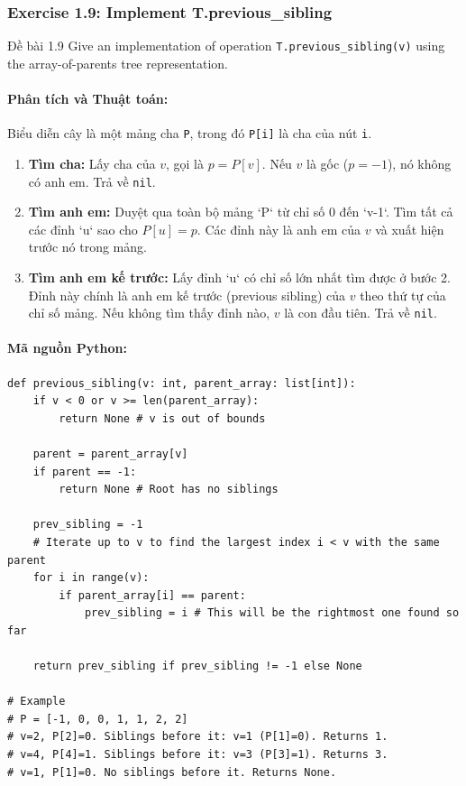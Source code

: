 \documentclass[a4paper,12pt]{article}
\begin{document}
\subsubsection{Exercise 1.9: Implement T.previous\_sibling}
\begin{problembox}{Đề bài 1.9}
    Give an implementation of operation \texttt{T.previous\_sibling(v)} using the array-of-parents tree representation.
\end{problembox}

\paragraph{Phân tích và Thuật toán:}
Biểu diễn cây là một mảng cha \texttt{P}, trong đó \texttt{P[i]} là cha của nút \texttt{i}.
\begin{enumerate}
    \item \textbf{Tìm cha:} Lấy cha của $v$, gọi là $p = P[v]$. Nếu $v$ là gốc ($p=-1$), nó không có anh em. Trả về \texttt{nil}.
    \item \textbf{Tìm anh em:} Duyệt qua toàn bộ mảng `P` từ chỉ số 0 đến `v-1`. Tìm tất cả các đỉnh `u` sao cho $P[u] = p$. Các đỉnh này là anh em của $v$ và xuất hiện trước nó trong mảng.
    \item \textbf{Tìm anh em kế trước:} Lấy đỉnh `u` có chỉ số lớn nhất tìm được ở bước 2. Đỉnh này chính là anh em kế trước (previous sibling) của $v$ theo thứ tự của chỉ số mảng. Nếu không tìm thấy đỉnh nào, $v$ là con đầu tiên. Trả về \texttt{nil}.
\end{enumerate}

\paragraph{Mã nguồn Python:}
\begin{lstlisting}[style=pythonstyle, caption={Tìm anh em kế trước trong biểu diễn Mảng Cha.}]
def previous_sibling(v: int, parent_array: list[int]):
    if v < 0 or v >= len(parent_array):
        return None # v is out of bounds
    
    parent = parent_array[v]
    if parent == -1:
        return None # Root has no siblings
        
    prev_sibling = -1
    # Iterate up to v to find the largest index i < v with the same parent
    for i in range(v):
        if parent_array[i] == parent:
            prev_sibling = i # This will be the rightmost one found so far
            
    return prev_sibling if prev_sibling != -1 else None

# Example
# P = [-1, 0, 0, 1, 1, 2, 2]
# v=2, P[2]=0. Siblings before it: v=1 (P[1]=0). Returns 1.
# v=4, P[4]=1. Siblings before it: v=3 (P[3]=1). Returns 3.
# v=1, P[1]=0. No siblings before it. Returns None.
\end{lstlisting}
\end{document}
